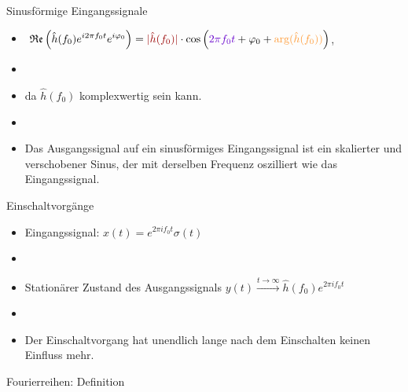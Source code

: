 \documentclass[14pt, aspectratio=169, handout]{beamer}
\begin{document}
\begin{frame}{Sinusförmige Eingangssignale}
    \begin{itemize}
        \item[] $\ \displaystyle\mathfrak{Re}\left(  \hat{h}(f_0) e^{i 2 \pi f_0 t} e^{i \varphi_0} \right) = \textcolor{myred}{|\hat{h}(f_0)|}\cdot \cos\left(\textcolor{mypurple}{2 \pi f_0 t} + \varphi_0 + \textcolor{myorange}{\text{arg}(\hat{h}(f_0))}\right)$, 
        \item[] 
        \item[] da $\hat{h}(f_0)$ komplexwertig sein kann.
        \item[] 
        \item Das Ausgangssignal auf ein sinusförmiges Eingangssignal ist ein \textcolor{myred}{skalierter} und \textcolor{myorange}{verschobener} Sinus, der mit \textcolor{mypurple}{derselben Frequenz} oszilliert wie das Eingangssignal.
    \end{itemize}
\end{frame}

\begin{frame}{Einschaltvorgänge}
    \begin{itemize}
    \item Eingangssignal: $x(t) = \displaystyle e^{2 \pi i f_0 t} \sigma(t) \hspace{15pt}$
    \item[] 
    \item Stationärer Zustand des Ausgangssignals $y(t) \displaystyle\xrightarrow{t \to \infty} \hat{h}(f_0) e^{2 \pi i f_0 t}$
    \item[] 
    \item Der Einschaltvorgang hat unendlich lange nach dem Einschalten keinen Einfluss mehr.
    \end{itemize}
\end{frame}

\begin{frame}{Fourierreihen: Definition}
\end{frame}
\end{document}
